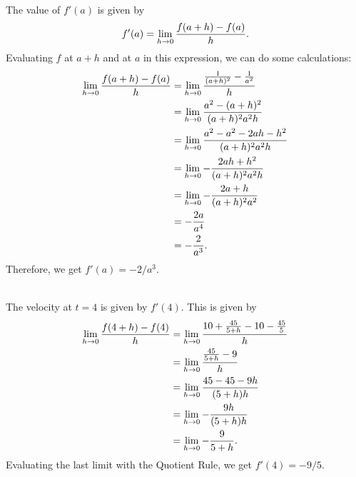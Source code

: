 	\spc
	
	\\
	The value of $f'(a)$ is given by
		\begin{align*}
		f' (a) = \lim_{h \rightarrow 0} \frac{f (a + h) - f(a)}{h} .
		\end{align*}
	Evaluating $f$ at $a + h$ and at $a$ in this expression, we can do some calculations:
		\begin{align*}
		\lim_{h \rightarrow 0} \frac{f (a + h) - f(a)}{h} &= \lim_{h \rightarrow 0} \frac{\frac{1}{(a + h)^2} - \frac{1}{a^2}}{h} \\
		&= \lim_{h \rightarrow 0} \frac{a^2 - (a + h)^2}{(a + h)^2 a^2 h} \\
		&= \lim_{h \rightarrow 0} \frac{a^2 - a^2 - 2ah - h^2}{(a + h)^2 a^2 h} \\
		&= \lim_{h \rightarrow 0} -\frac{2ah + h^2}{(a + h)^2 a^2 h} \\
		&= \lim_{h \rightarrow 0} - \frac{2a + h}{(a + h)^2 a^2} \\
		&= -\frac{2a}{a^4} \\
		&= -\frac{2}{a^3} .
		\end{align*}
	Therefore, we get $f'(a) = -2/a^3$. 
	
	\spc
	
	\\
	The velocity at $t = 4$ is given by $f'(4)$. This is given by
		\begin{align*}
		\lim_{h \rightarrow 0} \frac{f(4 + h) - f(4)}{h} &= \lim_{h \rightarrow 0} \frac{10 + \frac{45}{5 + h} - 10 - \frac{45}{5}}{h} \\
		&= \lim_{h \rightarrow 0} \frac{\frac{45}{5 + h} - 9}{h} \\
		&= \lim_{h \rightarrow 0} \frac{45 - 45 - 9h}{(5 + h) h} \\
		&= \lim_{h \rightarrow 0} - \frac{9h}{(5 + h) h} \\
		&= \lim_{h \rightarrow 0} -\frac{9}{5+ h} .
		\end{align*}
	Evaluating the last limit with the Quotient Rule, we get $f' (4) = -9/5$. 
	
	\newpage
	
